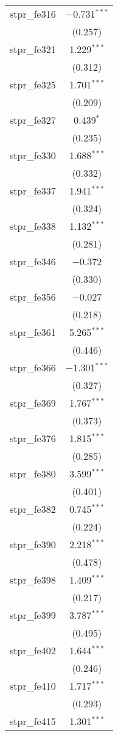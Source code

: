 \begin{table}[!htbp]
\begin{tabular}{@{\extracolsep{5pt}}lc}
  stpr\_fe316 & $-$0.731$^{***}$ \\ 
  & (0.257) \\ 
  stpr\_fe321 & 1.229$^{***}$ \\ 
  & (0.312) \\ 
  stpr\_fe325 & 1.701$^{***}$ \\ 
  & (0.209) \\ 
  stpr\_fe327 & 0.439$^{*}$ \\ 
  & (0.235) \\ 
  stpr\_fe330 & 1.688$^{***}$ \\ 
  & (0.332) \\ 
  stpr\_fe337 & 1.941$^{***}$ \\ 
  & (0.324) \\ 
  stpr\_fe338 & 1.132$^{***}$ \\ 
  & (0.281) \\ 
  stpr\_fe346 & $-$0.372 \\ 
  & (0.330) \\ 
  stpr\_fe356 & $-$0.027 \\ 
  & (0.218) \\ 
  stpr\_fe361 & 5.265$^{***}$ \\ 
  & (0.446) \\ 
  stpr\_fe366 & $-$1.301$^{***}$ \\ 
  & (0.327) \\ 
  stpr\_fe369 & 1.767$^{***}$ \\ 
  & (0.373) \\ 
  stpr\_fe376 & 1.815$^{***}$ \\ 
  & (0.285) \\ 
  stpr\_fe380 & 3.599$^{***}$ \\ 
  & (0.401) \\ 
  stpr\_fe382 & 0.745$^{***}$ \\ 
  & (0.224) \\ 
  stpr\_fe390 & 2.218$^{***}$ \\ 
  & (0.478) \\ 
  stpr\_fe398 & 1.409$^{***}$ \\ 
  & (0.217) \\ 
  stpr\_fe399 & 3.787$^{***}$ \\ 
  & (0.495) \\ 
  stpr\_fe402 & 1.644$^{***}$ \\ 
  & (0.246) \\ 
  stpr\_fe410 & 1.717$^{***}$ \\ 
  & (0.293) \\ 
  stpr\_fe415 & 1.301$^{***}$ \\ 

\end{tabular}
\end{table}
